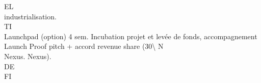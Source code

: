 \documentclass[12pt,landscape,a4paper]{article}
\begin{document}
EL\\
industrialisation.\\
\vspace{0.5em}
\vspace{0.5em}
\vspace{0.5em}
\vspace{0.5em}
TI\\
Launchpad (option)   4 sem.    Incubation projet et levée de fonds, accompagnement       Launch Proof pitch + accord revenue share (30\textbackslash{}%
\vspace{0.5em}
\vspace{0.5em}
\vspace{0.5em}
\vspace{0.5em}
N\\
Nexus.                                                    Nexus).\\
\vspace{0.5em}
\vspace{0.5em}
\vspace{0.5em}
\vspace{0.5em}
DE\\
FI\\
\end{document}
